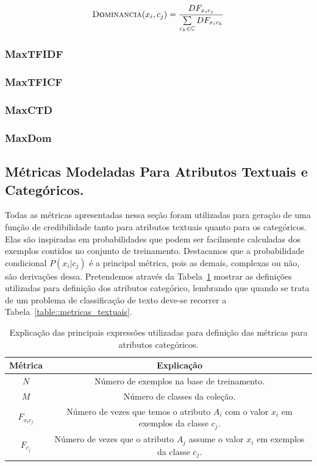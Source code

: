 \begin{equation}\label{eqn::dom}
 \textsc{Dominancia}(x_i, c_j) = \frac{ DF_{x_ic_j} } { \sum\limits_{c_k \in \mathbb{C}} DF_{ x_ic_k } } 
\end{equation}

\subsubsection{MaxTFIDF}
\label{subsubsection::maxtfidf}

\subsubsection{MaxTFICF} 
\label{subsubsection::maxtficf}

\subsubsection{MaxCTD}
\label{subsubsection::maxctd}

\subsubsection{MaxDom}
\label{subsubsection::maxdom}



\subsection{Métricas Modeladas Para Atributos Textuais e Categóricos.}
\label{subsec::pg_metricas_conteudo}


Todas as métricas apresentadas nessa seção foram utilizadas para geração de uma função de credibilidade tanto para atributos textuais quanto para os categóricos. Elas são inspiradas em probabilidades que podem ser facilmente calculadas dos exemplos contidos no conjunto de treinamento. Destacamos que a probabilidade condicional $P(x_i|c_j)$ é a principal métrica, pois as demais, complexas ou não, são derivações dessa. Pretendemos através da Tabela~\ref{table::metricas_textuais_categoricos} mostrar as definições utilizadas para definição dos atributos categórico, lembrando que quando se trata de um problema de classificação de texto deve-se recorrer a Tabela~\ref{table::metricas_textuais}.


\begin{table}[ht*]
\centering
\begin{tabular}{|c|c|}
\toprule
    \textbf{Métrica} & \textbf{Explicação} \\
\midrule
    $N$           & Número de exemplos na base de treinamento. \tabularnewline \hline
    $M$           & Número de classes da coleção. \tabularnewline \hline
    $F_{x_ic_j}$  & Número de vezes que temos o atributo $A_i$ com o valor $x_i$ em exemplos da classe $c_j$. \tabularnewline \hline
    $F_{c_j}$     & Número de vezes que o atributo $A_j$ assume o valor $x_i$ em exemplos da classe $c_j$. \tabularnewline 
\bottomrule
\end{tabular}
\caption{Explicação das principais expressões utilizadas para definição das métricas para atributos categóricos.}
\label{table::metricas_textuais_categoricos}
\end{table}

